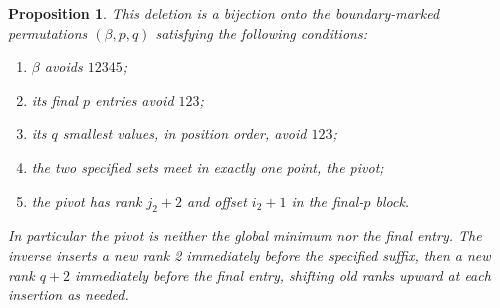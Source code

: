 \documentclass[11pt,letterpaper]{article}
\newtheorem{proposition}[theorem]{Proposition}
\theoremstyle{remark}\newtheorem{remark}[theorem]{Remark}
\numberwithin{equation}{section}
\begin{document}
\begin{proposition}\label{upo:ex5:prop:beta}
This deletion is a bijection onto the boundary-marked permutations
$(\beta,p,q)$ satisfying the following conditions:
\begin{enumerate}
\item $\beta$ avoids $12345$;
\item its final $p$ entries avoid $123$;
\item its $q$ smallest values, in position order, avoid $123$;
\item the two specified sets meet in exactly one point, the pivot;
\item the pivot has rank $j_2+2$ and offset $i_2+1$ in the final-$p$
block.
\end{enumerate}
In particular the pivot is neither the global minimum nor the final
entry. The inverse inserts a new rank 2 immediately before the
specified suffix, then a new rank $q+2$ immediately before the final
entry, shifting old ranks upward at each insertion as needed.
\end{proposition}
\end{document}
